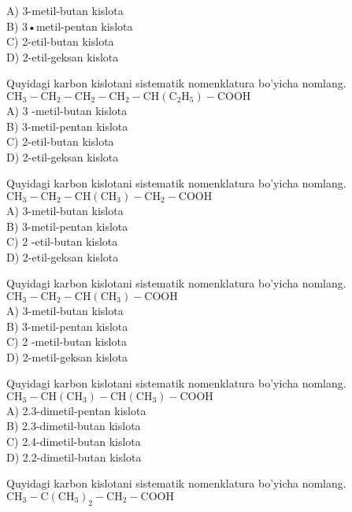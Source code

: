 A) 3-metil-butan kislota\\
B) 3•metil-pentan kislota\\
C) 2-etil-butan kislota\\
D) 2-etil-geksan kislota\\
  \item Quyidagi karbon kislotani sistematik nomenklatura bo'yicha nomlang.\\
$\mathrm{CH}_{3}-\mathrm{CH}_{2}-\mathrm{CH}_{2}-\mathrm{CH}_{2}-\mathrm{CH}\left(\mathrm{C}_{2} \mathrm{H}_{5}\right)-\mathrm{COOH}$\\
A) 3 -metil-butan kislota\\
B) 3-metil-pentan kislota\\
C) 2-etil-butan kislota\\
D) 2-etil-geksan kislota
  \item Quyidagi karbon kislotani sistematik nomenklatura bo'yicha nomlang.\\$\mathrm{CH}_{3}-\mathrm{CH}_{2}-\mathrm{CH}\left(\mathrm{CH}_{3}\right)-\mathrm{CH}_{2}-\mathrm{COOH}$\\
A) 3-metil-butan kislota\\
B) 3-metil-pentan kislota\\
C) 2 -etil-butan kislota\\
D) 2-etil-geksan kislota
  \item Quyidagi karbon kislotani sistematik nomenklatura bo'yicha nomlang.\\
$\mathrm{CH}_{3}-\mathrm{CH}_{2}-\mathrm{CH}\left(\mathrm{CH}_{3}\right)-\mathrm{COOH}$\\
A) 3-metil-butan kislota\\
B) 3-metil-pentan kislota\\
C) 2 -metil-butan kislota\\
D) 2-metil-geksan kislota
  \item Quyidagi karbon kislotani sistematik nomenklatura bo'yicha nomlang.\\
$\mathrm{CH}_{3}-\mathrm{CH}\left(\mathrm{CH}_{3}\right)-\mathrm{CH}\left(\mathrm{CH}_{3}\right)-\mathrm{COOH}$\\
A) 2.3-dimetil-pentan kislota\\
B) 2.3-dimetil-butan kislota\\
C) 2.4-dimetil-butan kislota\\
D) 2.2-dimetil-butan kislota
  \item Quyidagi karbon kislotani sistematik nomenklatura bo'yicha nomlang.\\
$\mathrm{CH}_{3}-\mathrm{C}\left(\mathrm{CH}_{3}\right)_{2}-\mathrm{CH}_{2}-\mathrm{COOH}$\\
